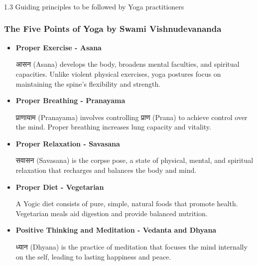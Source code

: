 \begin{frame}[fragile]\frametitle{}
\begin{center}
{\Large 1.3 Guiding principles to be followed by Yoga practitioners}
\end{center}
\end{frame}

\begin{frame}[fragile]\frametitle{The Five Points of Yoga by Swami Vishnudevananda}
    \begin{itemize}
        \item \textbf{Proper Exercise - Asana}
            
            आसन (Asana) develops the body, broadens mental faculties, and spiritual capacities. Unlike violent physical exercises, yoga postures focus on maintaining the spine’s flexibility and strength.
            
        \item \textbf{Proper Breathing - Pranayama}
            
            प्राणायाम (Pranayama) involves controlling प्राण (Prana) to achieve control over the mind. Proper breathing increases lung capacity and vitality.
            
        \item \textbf{Proper Relaxation - Savasana}
            
            सवासन (Savasana) is the corpse pose, a state of physical, mental, and spiritual relaxation that recharges and balances the body and mind.
            
        \item \textbf{Proper Diet - Vegetarian}
            
            A Yogic diet consists of pure, simple, natural foods that promote health. Vegetarian meals aid digestion and provide balanced nutrition.
            
        \item \textbf{Positive Thinking and Meditation - Vedanta and Dhyana}
            
            ध्यान (Dhyana) is the practice of meditation that focuses the mind internally on the self, leading to lasting happiness and peace.
            
    \end{itemize}
\end{frame}


